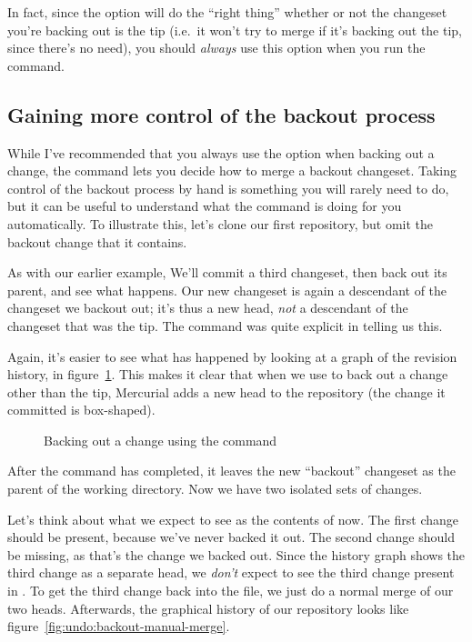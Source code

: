 In fact, since the  option will do the ``right
thing'' whether or not the changeset you're backing out is the tip
(i.e.~it won't try to merge if it's backing out the tip, since there's
no need), you should \emph{always} use this option when you run the
 command.

\subsection{Gaining more control of the backout process}

While I've recommended that you always use the
 option when backing out a change, the
 command lets you decide how to merge a backout
changeset.  Taking control of the backout process by hand is something
you will rarely need to do, but it can be useful to understand what
the  command is doing for you automatically.  To
illustrate this, let's clone our first repository, but omit the
backout change that it contains.

As with our earlier example, We'll commit a third changeset, then back
out its parent, and see what happens.
Our new changeset is again a descendant of the changeset we backout
out; it's thus a new head, \emph{not} a descendant of the changeset
that was the tip.  The  command was quite explicit in
telling us this.

Again, it's easier to see what has happened by looking at a graph of
the revision history, in figure~\ref{fig:undo:backout-manual}.  This
makes it clear that when we use  to back out a change
other than the tip, Mercurial adds a new head to the repository (the
change it committed is box-shaped).

\begin{figure}[htb]
  \centering
  \caption{Backing out a change using the  command}
  \label{fig:undo:backout-manual}
\end{figure}

After the  command has completed, it leaves the new
``backout'' changeset as the parent of the working directory.
Now we have two isolated sets of changes.

Let's think about what we expect to see as the contents of
 now.  The first change should be present, because
we've never backed it out.  The second change should be missing, as
that's the change we backed out.  Since the history graph shows the
third change as a separate head, we \emph{don't} expect to see the
third change present in .
To get the third change back into the file, we just do a normal merge
of our two heads.
Afterwards, the graphical history of our repository looks like
figure~\ref{fig:undo:backout-manual-merge}.

